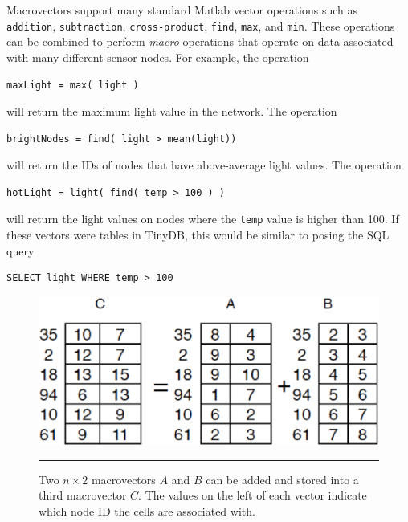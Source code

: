 Macrovectors support many standard Matlab vector operations such as {\tt
addition}, {\tt subtraction}, {\tt cross-product}, {\tt find}, {\tt max}, and
{\tt min}.  These operations can be combined to perform {\em macro}
operations that operate on data associated with many different sensor
nodes.  For example, the operation
\vspace{.1in}
\begin{center}
\ttfamily\small
\begin{verbatim}
maxLight = max( light )
\end{verbatim}
\end{center}
\vspace{.1in}
will return the maximum light value in the network.  
The operation
\vspace{.1in}
\begin{center}
\ttfamily\small
\begin{verbatim}
brightNodes = find( light > mean(light))
\end{verbatim}
\end{center}
\vspace{.1in}
will return the IDs of nodes that have above-average light values.  
The operation
\vspace{.1in}
\begin{center}
\ttfamily\small
\begin{verbatim}
hotLight = light( find( temp > 100 ) )
\end{verbatim}
\end{center}
\vspace{.1in}
will return the light values on nodes where the {\tt temp} value is higher
than 100.  If these vectors were tables in TinyDB, this would be similar
to posing the SQL query
\vspace{.1in}
\begin{center}
\ttfamily\small
\begin{verbatim}
SELECT light WHERE temp > 100
\end{verbatim}
\end{center}
\vspace{.1in}

\begin{figure}
  \centering
  \includegraphics[width=1\columnwidth]{fig/DistributedArray1.eps}
  \smallskip
  \hrule
  \caption[Example of a distributed macrovector]{Two $n \times 2$ macrovectors $A$ and $B$ can be added and stored
    into a third macrovector $C$. The values on the left of each vector indicate
    which node ID the cells are associated with.}
  \label{fig:macroVectorAddition}
\end{figure}

